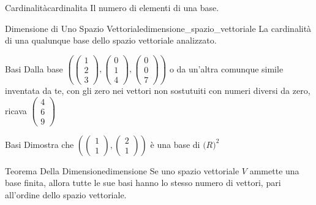 \documentclass{article}
\begin{document}
\begin{definition}{Cardinalità}{cardinalita}
    Il numero di elementi di una base.
\end{definition}

\begin{definition}{Dimensione di Uno Spazio Vettoriale}{dimensione_spazio_vettoriale}
    La cardinalità di una qualunque base dello spazio vettoriale analizzato.
\end{definition}

\begin{exercise}{Basi}{}
    Dalla base $(\begin{pmatrix}
            1 \\
            2 \\
            3
            \end{pmatrix}, \begin{pmatrix}
            0 \\
            1 \\
            4
            \end{pmatrix}, \begin{pmatrix}
            0 \\
            0 \\
            7
            \end{pmatrix})$ o da un'altra comunque simile inventata da te, con gli zero nei vettori non sostutuiti con numeri diversi da zero, ricava $\begin{pmatrix}
            4 \\
            6 \\
            9
            \end{pmatrix}$
\end{exercise}

\begin{exercise}{Basi}{}
    Dimostra che
    $(\begin{pmatrix}
        1 \\
        1 
    \end{pmatrix}, \begin{pmatrix}
        2 \\
        1 
    \end{pmatrix})$ è una base di $\mathbb(R)^2$
\end{exercise}

\begin{exercise}{Teorema Della Dimensione}{dimensione}
    Se uno spazio vettoriale $V$ ammette una base finita, allora tutte le sue basi hanno lo stesso numero di vettori, pari all'ordine dello spazio vettoriale.
\end{exercise}
\end{document}
